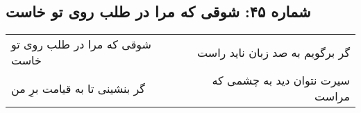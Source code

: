 \begin{center}
\section*{شماره ۴۵: شوقی که مرا در طلب روی تو خاست}
\label{sec:045}
\begin{longtable}{l p{0.5cm} r}
شوقی که مرا در طلب روی تو خاست
&&
گر برگویم به صد زبان ناید راست
\\
گر بنشینی تا به قیامت برِ من
&&
سیرت نتوان دید به چشمی که مراست
\\
\end{longtable}
\end{center}

